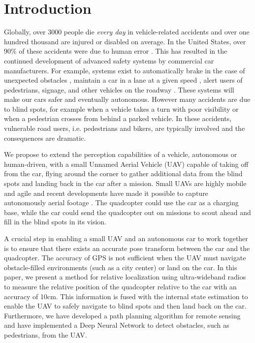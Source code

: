 
\section{Introduction}

%
%

Globally, over 3000 people die \emph{every day} \cite{ASIR2016} in vehicle-related accidents and over one hundred thousand are injured or disabled on average.
In the United States, over 90\% of these accidents were due to human error \cite{NHTSA_crash_stats}.
This has resulted in the continued development of advanced safety systems by commercial car manufacturers.
For example, systems exist to automatically brake in the case of unexpected obstacles \cite{Toyota_patent}, maintain a car in a lane at a given speed \cite{bradley2016tesla}, alert users of pedestrians, signage, and other vehicles on the roadway \cite{Dagan_IVS_2004}. These systems will make our cars safer and eventually autonomous.
However many accidents are due to blind spots, for example when a vehicle takes a turn with poor visibility or when a pedestrian crosses from behind a parked vehicle. In these accidents, vulnerable road users, i.e. pedestrians and bikers, are typically involved and the consequences are dramatic.

We propose to extend the perception capabilities of a vehicle, autonomous or human-driven, with a small Unnamed Aerial Vehicle (UAV) capable of taking off from the car, flying around the corner to gather additional data from the blind spots and landing back in the car after a mission. Small UAVs are highly mobile and agile and recent developments have made it possible to capture autonomously aerial footage \cite{naegeli17letters}.
The quadcopter could use the car as a charging base,
while the car could send the quadcopter out on missions to scout ahead and
fill in the blind spots in its vision.

A crucial step in enabling a small UAV and an autonomous car to work
together is to ensure that there exists an accurate pose transform between the car
and the quadcopter. The accuracy of GPS is not sufficient when the UAV must navigate
obstacle-filled environments (such as a city center) or land on the car. In this 
paper, we present a method for relative localization using ultra-wideband radios to measure the relative position of the quadcopter relative to the car with an accuracy of 10cm. This information is fused with the internal state estimation to enable the UAV to safely navigate to blind spots and then land back on the car. Furthermore, we have developed a path planning algorithm for remote sensing and have implemented a Deep Neural Network to detect obstacles, such as pedestrians, from the UAV.


